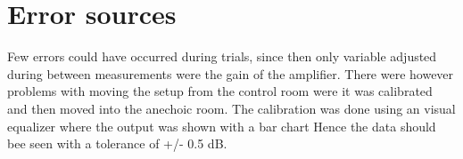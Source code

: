 \section{Error sources}

Few errors could have occurred during trials, since then only variable adjusted during between measurements were the gain of the amplifier. There were however problems with moving the setup from the control room were it was calibrated and then moved into the anechoic room. The calibration was done using an visual equalizer where the output was shown with a bar chart Hence the data should bee seen with a tolerance of +/- 0.5 dB.